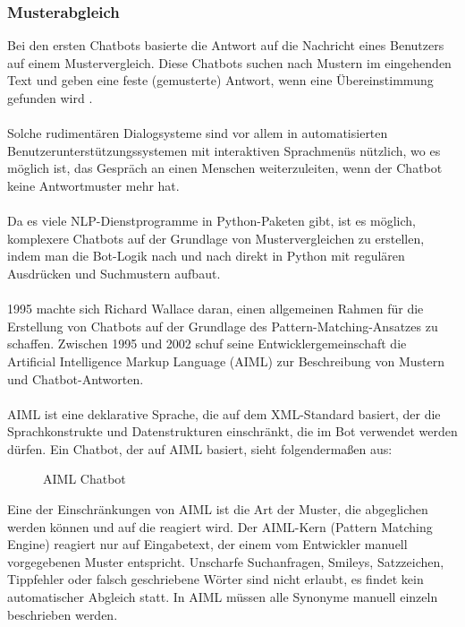\subsubsection{Musterabgleich}
Bei den ersten Chatbots basierte die Antwort auf die Nachricht eines Benutzers auf einem Mustervergleich. 
Diese Chatbots suchen nach Mustern im eingehenden Text und geben eine feste (gemusterte) Antwort, wenn eine Übereinstimmung gefunden wird \cite{woudenberg_chatbot_2014}.\\\\
Solche rudimentären Dialogsysteme sind vor allem in automatisierten Benutzerunterstützungssystemen mit interaktiven Sprachmenüs nützlich, wo es möglich ist, das Gespräch an einen Menschen weiterzuleiten, wenn der Chatbot keine Antwortmuster mehr hat.\\\\
Da es viele NLP-Dienstprogramme in Python-Paketen gibt, ist es möglich, komplexere Chatbots auf der Grundlage von Mustervergleichen zu erstellen, indem man die Bot-Logik nach und nach direkt in Python mit regulären Ausdrücken und Suchmustern aufbaut.\\\\
1995 machte sich Richard Wallace daran, einen allgemeinen Rahmen für die Erstellung von Chatbots auf der Grundlage des Pattern-Matching-Ansatzes zu schaffen. Zwischen 1995 und 2002 schuf seine Entwicklergemeinschaft die Artificial Intelligence Markup Language (AIML) zur Beschreibung von Mustern und Chatbot-Antworten.\\\\
AIML ist eine deklarative Sprache, die auf dem XML-Standard basiert, der die Sprachkonstrukte und Datenstrukturen einschränkt, die im Bot verwendet werden dürfen. Ein Chatbot, der auf AIML basiert, sieht folgendermaßen aus:
\begin{figure}[H]
    \centering
    \caption{\label{figure:Aiml_Bot}AIML Chatbot}
\end{figure}
\noindent
Eine der Einschränkungen von AIML ist die Art der Muster, die abgeglichen werden können und auf die reagiert wird. 
Der AIML-Kern (Pattern Matching Engine) reagiert nur auf Eingabetext, der einem vom Entwickler manuell vorgegebenen Muster entspricht. 
Unscharfe Suchanfragen, Smileys, Satzzeichen, Tippfehler oder falsch geschriebene Wörter sind nicht erlaubt, es findet kein automatischer Abgleich statt. In AIML müssen alle Synonyme manuell einzeln beschrieben werden.
